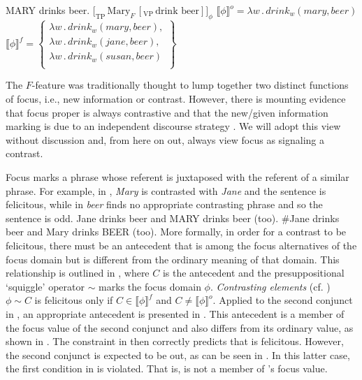\documentclass[output=paper,colorlinks,citecolor=brown]{langscibook}
\begin{document}
\is{}
\ea MARY drinks beer.\label{Foc.Mary}
    \ea $\text{[}_{\text{TP}} \, \text{Mary}_{F} \, [_{\text{VP}} \, \text{drink beer}]]_{\phi} $ 
    \ex $\llbracket \phi \rrbracket^{o} = \lambda w \, . \, drink_w(mary, beer)$ \\
        $\llbracket \phi \rrbracket^{f} = \left\{ \begin{array}{l}
            \lambda w \, . \, drink_w(mary,beer), \\ 
            \lambda w \, . \,drink_w(jane,beer), \\ 
            \lambda w \, . \,drink_w(susan,beer) \\ 
            \end{array} \right\}  $
    \z
\z
\il{}

The $F$-feature was traditionally thought to lump together two distinct functions of focus, i.e., new information or contrast. However, there is mounting evidence that focus proper is always contrastive and that the new/given information marking is due to an independent discourse strategy \citep{Kratzer2004, Fery2006, Selkirk2008, Katz2011, Beaver2011, Rochemont2013, Buring2019, Kratzer2020, Goodhue2022}. We will adopt this view without discussion and, from here on out, always view focus as signaling a contrast.

Focus marks a phrase whose referent is juxtaposed with the referent of a similar phrase. For example, in , \textit{Mary} is contrasted with \textit{Jane} and the sentence is felicitous, while in  \textit{beer} finds no appropriate contrasting phrase and so the sentence is odd. 
\is{}
\ea\label{Foc.Contr.Eg}
    \ea Jane drinks beer and MARY drinks beer (too).\label{Foc.Contr.Fel}
    \ex \#Jane drinks beer and Mary drinks BEER (too).\label{Foc.Contr.Infel}
    \z
\z
\il{}
More formally, in order for a contrast to be felicitous, there must be an antecedent that is among the focus alternatives of the focus domain but is different from the ordinary meaning of that domain. This relationship is outlined in , where $C$ is the antecedent and the presuppositional `squiggle' operator $\sim$ marks the focus domain $\phi$.  
\is{}
\ea \textit{Contrasting elements}  (cf. \citealt[90]{Rooth1992}) \\
    $\phi \sim C$ is felicitous only if $C \in  \llbracket \phi \rrbracket ^f$ and $C \ne \llbracket \phi  \rrbracket ^o$.\label{Foc.Contr.Req} 
\z
\il{}
Applied to the second conjunct in , an appropriate antecedent is presented in . This antecedent is a member of the focus value of the second conjunct and also differs from its ordinary value, as shown in . The constraint in  then correctly predicts that  is felicitous. However, the second conjunct  is expected to be out, as can be seen in . In this latter case, the first condition in  is violated. That is,  is not a member of 's focus value.
\end{document}
